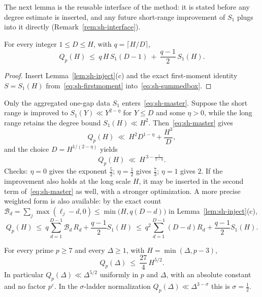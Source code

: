 The next lemma is the reusable interface of the method: it is stated
before any degree estimate is inserted, and any future short-range
improvement of $S_1$ plugs into it directly
(Remark~\ref{rem:sh-interface}).

\begin{lemma}\label{lem:sh-master}
For every integer $1\le D\le H$, with $q=\lceil H/D\rceil$,
\begin{equation}\label{eq:sh-master}
 \boxed{\ Q_p(H)\ \le\ q\,H\,S_1(D-1)\ +\ \frac{q-1}{2}\,S_1(H).\ }
\end{equation}
\end{lemma}

\begin{proof}
Insert Lemma~\ref{lem:sh-inject}(c) and the exact first-moment identity
$S=S_1(H)$ from~\eqref{eq:sh-firstmoment}
into~\eqref{eq:sh-summedbox}.
\end{proof}

\begin{remark}
\label{rem:sh-interface}
Only the aggregated one-gap data $S_1$ enters~\eqref{eq:sh-master}.
Suppose the short range is improved to
$S_1(Y)\ll Y^{2-\eta}$ for $Y\le D$ and some $\eta>0$, while the long
range retains the degree bound $S_1(H)\ll H^2$.
Then~\eqref{eq:sh-master} gives
\[
 Q_p(H)\ \ll\ H^2D^{1-\eta}+\frac{H^3}{D},
\]
and the choice $D=H^{1/(2-\eta)}$ yields
\[
 Q_p(H)\ \ll\ H^{\,3-\frac{1}{2-\eta}} .
\]
Checks: $\eta=0$ gives the exponent $\tfrac52$; $\eta=\tfrac12$ gives
$\tfrac73$; $\eta=1$ gives $2$.  If the improvement also holds at the
long scale $H$, it may be inserted in the second term
of~\eqref{eq:sh-master} as well, with a stronger optimization.  A more
precise weighted form is also available: by the exact count
$\mathcal B_d=\sum_j\max(\ell_j-d,0)\le\min\bigl(H,q(D-d)\bigr)$ in
Lemma~\ref{lem:sh-inject}(c),
\[
 Q_p(H)\ \le\ q\sum_{d=1}^{D-1}\mathcal B_d\,R_d+\frac{q-1}{2}S_1(H)
 \ \le\ q^2\sum_{d=1}^{D-1}(D-d)R_d+\frac{q-1}{2}S_1(H).
\]
\end{remark}

\begin{theorem}[$\sigma=\tfrac12$; explicit constant]
\label{thm:sh-sigma-half}
For every prime $p\ge7$ and every $\Delta\ge1$, with
$H=\min(\Delta,p-3)$,
\[
 Q_p(\Delta)\ \le\ \frac{27}{4}\,H^{5/2}.
\]
In particular $Q_p(\Delta)\ll\Delta^{5/2}$ uniformly in $p$ and
$\Delta$, with an absolute constant and no factor $p^\varepsilon$.  In
the $\sigma$-ladder normalization $Q_p(\Delta)\ll\Delta^{3-\sigma}$ this
is $\sigma=\tfrac12$.
\end{theorem}

